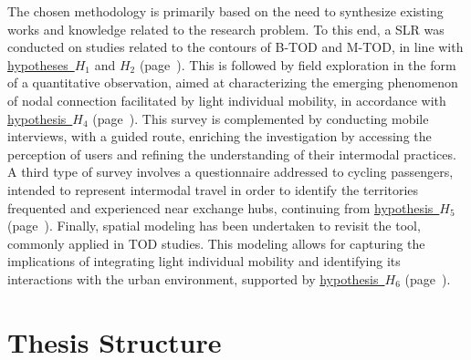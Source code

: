 \begin{refsegment}
The chosen methodology is primarily based on the need to synthesize existing works and knowledge related to the research problem. To this end, a \acrfull{SLR} was conducted on studies related to the contours of \acrshort{B-TOD} and \acrshort{M-TOD}, in line with \hyperref[hypothese-1]{hypotheses~\(H_1\)} and \hyperref[hypothese-2]{\(H_2\)} (page~\pageref{hypothese-2}). This is followed by field exploration in the form of a quantitative observation, aimed at characterizing the emerging phenomenon of nodal connection facilitated by light individual mobility, in accordance with \hyperref[hypothese-4]{hypothesis~\(H_4\)} (page~\pageref{hypothese-4}). This survey is complemented by conducting mobile interviews, with a guided route, enriching the investigation by accessing the \gls{perception} of users and refining the understanding of their intermodal practices. A third type of survey involves a questionnaire addressed to cycling passengers, intended to represent intermodal travel in order to identify the territories frequented and experienced near exchange hubs, continuing from \hyperref[hypothese-5]{hypothesis~\(H_5\)} (page~\pageref{hypothese-5}). Finally, spatial modeling has been undertaken to revisit the  tool, commonly applied in \acrshort{TOD} studies. This modeling allows for capturing the implications of integrating light individual mobility and identifying its interactions with the urban environment, supported by \hyperref[hypothese-6]{hypothesis~\(H_6\)} (page~\pageref{hypothese-6}).%

\section*{Thesis Structure
    \label{introduction-generale:annonce-plan}
    }


\end{refsegment}
